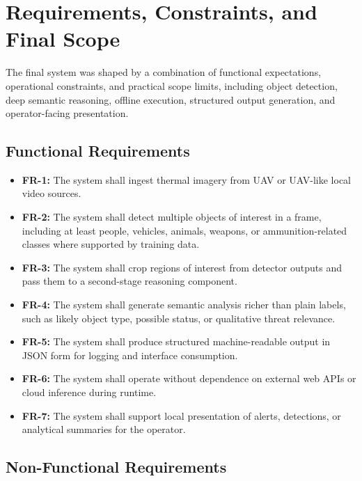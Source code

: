 \section{Requirements, Constraints, and Final Scope}
\label{sec:reqs}

The final system was shaped by a combination of functional expectations, operational
constraints, and practical scope limits, including object detection, deep semantic reasoning, offline execution,
structured output generation, and operator-facing presentation.

\subsection{Functional Requirements}

\begin{itemize}[nosep]
  \item \textbf{FR-1:} The system shall ingest thermal imagery from UAV or UAV-like local
    video sources.
  \item \textbf{FR-2:} The system shall detect multiple objects of interest in a frame,
    including at least people, vehicles, animals, weapons, or ammunition-related classes
    where supported by training data.
  \item \textbf{FR-3:} The system shall crop regions of interest from detector outputs and
    pass them to a second-stage reasoning component.
  \item \textbf{FR-4:} The system shall generate semantic analysis richer than plain labels,
    such as likely object type, possible status, or qualitative threat relevance.
  \item \textbf{FR-5:} The system shall produce structured machine-readable output in JSON
    form for logging and interface consumption.
  \item \textbf{FR-6:} The system shall operate without dependence on external web APIs or
    cloud inference during runtime.
  \item \textbf{FR-7:} The system shall support local presentation of alerts, detections, or
    analytical summaries for the operator.
\end{itemize}

\subsection{Non-Functional Requirements}

